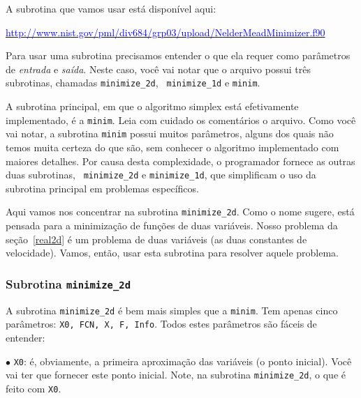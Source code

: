 \documentclass[10pt,a4paper,ssfamily]{exam}
\begin{document}
A subrotina que vamos usar está disponível aqui:

\begin{center}
\href{http://www.nist.gov/pml/div684/grp03/upload/NelderMeadMinimizer.f90}
{\textcolor{blue}{http://www.nist.gov/pml/div684/grp03/upload/NelderMeadMinimizer.f90}}
\end{center}

Para usar uma subrotina precisamos entender o que ela requer como
parâmetros de {\it entrada} e {\it saída}. Neste caso, você vai notar
que o arquivo possui três subrotinas, chamadas {\tt minimize\_2d}, {\tt
minimize\_1d} e {\tt minim}. 

A subrotina principal, em que o algoritmo simplex está efetivamente
implementado, é a {\tt minim}. Leia com cuidado os comentários o
arquivo. Como você vai notar, a subrotina {\tt minim} possui muitos
parâmetros, alguns dos quais não temos muita certeza do que são, sem
conhecer o algoritmo implementado com maiores detalhes. Por causa desta
complexidade, o programador fornece as outras duas subrotinas, {\tt
minimize\_2d} e {\tt minimize\_1d}, que simplificam o uso da subrotina
principal em problemas específicos.

Aqui vamos nos concentrar na subrotina {\tt minimize\_2d}. Como o nome
sugere, está pensada para a minimização de funções de duas variáveis.
Nosso problema da seção~\ref{real2d} é um problema de duas variáveis (as
duas constantes de velocidade). Vamos, então, usar esta subrotina para
resolver aquele problema.

\subsubsection{Subrotina {\tt minimize\_2d}}

A subrotina {\tt minimize\_2d} é bem mais simples que a {\tt minim}. Tem
apenas cinco parâmetros: {\tt X0, FCN, X, F, Info}. Todos estes
parâmetros são fáceis de entender:


$\bullet$ {\tt X0}: é, obviamente, a primeira
aproximação das variáveis (o ponto inicial). Você vai ter que fornecer
este ponto inicial. Note, na subrotina {\tt minimize\_2d}, o que é feito com {\tt X0}.
\end{document}
